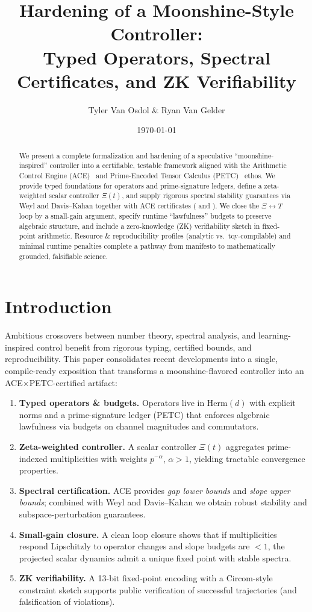 \documentclass[11pt]{article}
\title{\vspace{-1em}\textbf{Hardening of a Moonshine-Style Controller: \\
Typed Operators, Spectral Certificates, and ZK Verifiability}}
\author{Tyler Van Osdol \&  Ryan Van Gelder}
\date{\today}
\newcommand{\Herm}[1]{\mathrm{Herm}(#1)}
\newcommand{\GapLB}{\mathrm{GapLB}}
\newcommand{\SlopeUB}{\mathrm{SlopeUB}}
\newcommand{\ACE}{Arithmetic Control Engine (ACE)~\cite{ACE}}
\newcommand{\PETC}{Prime-Encoded Tensor Calculus (PETC)~\cite{PETC}}
\theoremstyle{plain}
\theoremstyle{definition}
\theoremstyle{remark}
\begin{document}
\maketitle

\begin{abstract}
We present a complete formalization and hardening of a speculative ``moonshine-inspired'' controller into a certifiable, testable framework aligned with the \ACE{} and \PETC{} ethos. We provide typed foundations for operators and prime-signature ledgers, define a zeta-weighted scalar controller $\Xi(t)$, and supply rigorous spectral stability guarantees via Weyl and Davis--Kahan together with ACE certificates (\GapLB{} and \SlopeUB{}). We close the $\Xi\leftrightarrow T$ loop by a small-gain argument, specify runtime ``lawfulness'' budgets to preserve algebraic structure, and include a zero-knowledge (ZK) verifiability sketch in fixed-point arithmetic. Resource \& reproducibility profiles (analytic vs.\ toy-compilable) and minimal runtime penalties complete a pathway from manifesto to mathematically grounded, falsifiable science.
\end{abstract}

\vspace{-0.5em}
\section{Introduction}
Ambitious crossovers between number theory, spectral analysis, and learning-inspired control benefit from rigorous typing, certified bounds, and reproducibility. This paper consolidates recent developments into a single, compile-ready exposition that transforms a moonshine-flavored controller into an ACE×PETC-certified artifact:
\begin{enumerate}[leftmargin=2em]
  \item \textbf{Typed operators \& budgets.} Operators live in $\Herm{d}$ with explicit norms and a prime-signature ledger (PETC) that enforces algebraic lawfulness via budgets on channel magnitudes and commutators.
  \item \textbf{Zeta-weighted controller.} A scalar controller $\Xi(t)$ aggregates prime-indexed multiplicities with weights $p^{-\alpha}$, $\alpha>1$, yielding tractable convergence properties.
  \item \textbf{Spectral certification.} ACE provides \emph{gap lower bounds} and \emph{slope upper bounds}; combined with Weyl and Davis--Kahan we obtain robust stability and subspace-perturbation guarantees.
  \item \textbf{Small-gain closure.} A clean loop closure shows that if multiplicities respond Lipschitzly to operator changes and slope budgets are $<1$, the projected scalar dynamics admit a unique fixed point with stable spectra.
  \item \textbf{ZK verifiability.} A 13-bit fixed-point encoding with a Circom-style constraint sketch supports public verification of successful trajectories (and falsification of violations).
\end{enumerate}
\end{document}
